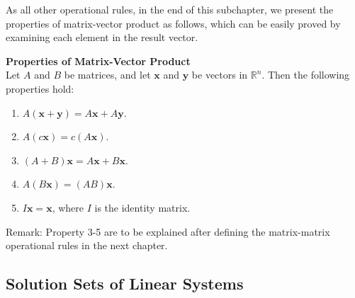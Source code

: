 \documentclass[10pt, a4paper]{article}
\begin{document}
\indent As all other operational rules, in the end of this subchapter, we present the properties of matrix-vector product as follows, which can be easily proved by examining each element in the result vector.
\begin{proposition}
    \textbf{Properties of Matrix-Vector Product}\\
    Let $A$ and $B$ be matrices, and let $\mathbf{x}$ and $\mathbf{y}$ be vectors in $\mathbb{R}^n$. Then the following properties hold:
    \begin{enumerate}
        \item $A(\mathbf{x}+\mathbf{y})=A\mathbf{x}+A\mathbf{y}$.
        \item $A(c\mathbf{x})=c(A\mathbf{x})$.
        \item $(A+B)\mathbf{x}=A\mathbf{x}+B\mathbf{x}$.
        \item $A(B\mathbf{x})=(AB)\mathbf{x}$.
        \item $I\mathbf{x}=\mathbf{x}$, where $I$ is the identity matrix.
    \end{enumerate}
    Remark: Property 3-5 are to be explained after defining the matrix-matrix operational rules in the next chapter.
\end{proposition}

\subsection{Solution Sets of Linear Systems}
\end{document}
